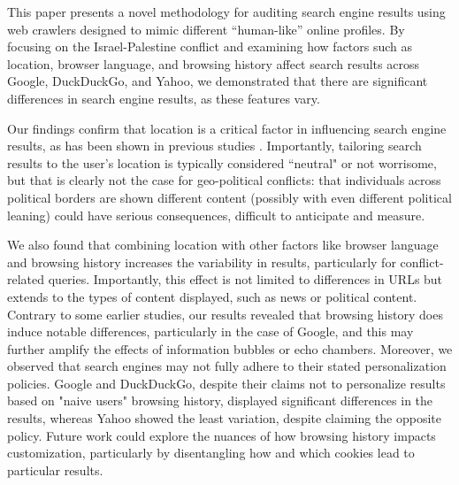 This paper presents a novel methodology for auditing search engine results using web crawlers designed to mimic different ``human-like'' online profiles. By focusing on the Israel-Palestine conflict and examining how factors such as location, browser language, and browsing history affect search results across Google, DuckDuckGo, and Yahoo, we demonstrated that there are significant differences in search engine results, as these features vary.


Our findings confirm that location is a critical factor in influencing search engine results, as has been shown in previous studies \cite{inconsistent_search_results, personalization_web_search}. Importantly, tailoring search results to the user's location is typically considered ``neutral" or not worrisome, but that is clearly not the case for geo-political conflicts: that individuals across political borders are shown different content (possibly with even different political leaning) could have serious consequences, difficult to anticipate and measure.

We also found that combining location with other factors like browser language and browsing history increases the variability in results, particularly for conflict-related queries. Importantly, this effect is not limited to differences in URLs but extends to the types of content displayed, such as news or political content. Contrary to some earlier studies, our results revealed that browsing history does induce notable differences, particularly in the case of Google, and this may further amplify the effects of information bubbles or echo chambers. Moreover, we observed that search engines may not fully adhere to their stated personalization policies. Google and DuckDuckGo, despite their claims not to personalize results based on "naive users" browsing history, displayed significant differences in the results, whereas Yahoo showed the least variation, despite claiming the opposite policy. Future work could explore the nuances of how browsing history impacts customization, particularly by disentangling how and which cookies lead to particular results.

